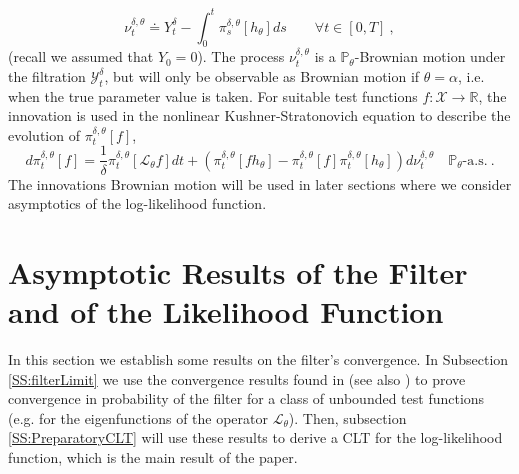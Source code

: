 \documentclass{article}
\begin{document}
\[\nu_t^{\delta,\theta}\doteq Y_t^\delta- \int_0^t\pi^{\delta,\theta}_{s}[h_\theta]ds\qquad\forall t\in[0,T]\ ,\]
(recall we assumed that $Y_0 = 0$). The process $\nu_t^{\delta,\theta}$ is a $\mathbb P_{\theta}$-Brownian motion under the filtration $\mathcal Y_t^\delta$, but will only be observable as Brownian motion if $\theta=\alpha$, i.e. when the true parameter value is taken. For suitable test functions $f:\mathcal X\rightarrow \mathbb R$, the innovation is used in the nonlinear Kushner-Stratonovich equation to describe the evolution of $\pi_t^{\delta,\theta}[f]$,
\begin{equation}
\label{Eq:Kushner}
d\pi_t^{\delta,\theta}[f] = \frac 1\delta \pi^{\delta,\theta}_{t}[\mathcal L_{\theta} f] dt+ \left(\pi^{\delta,\theta}_{t}[f h_{\theta}]-\pi^{\delta,\theta}_{t}[f]\pi^{\delta,\theta}_{t}[h_{\theta}]\right)d\nu_t^{\delta,\theta}\quad \mathbb{P}_{\theta}\textrm{-a.s.}\ . \end{equation}
The innovations Brownian motion will be used in later sections where we consider asymptotics of the log-likelihood function.


\section{Asymptotic Results of the Filter and of the Likelihood Function}\label{S:filterLimit}

In this section we establish some results on the filter's convergence. In Subsection \ref{SS:filterLimit} we use the convergence results found in \cite{ImkellerSriPerkowskiYeong2012} (see also \cite{ParkSriSowers2008, ParkRozovskySowers2010,ParkSriSowers2011,ImkellerSriPerkowskiYeong2012}) to prove convergence in probability of the filter for a class of unbounded test functions (e.g. for the eigenfunctions of the operator $\mathcal L_\theta$). Then, subsection \ref{SS:PreparatoryCLT} will use these results to derive a CLT for the log-likelihood function, which is the main result of the paper.
\end{document}
